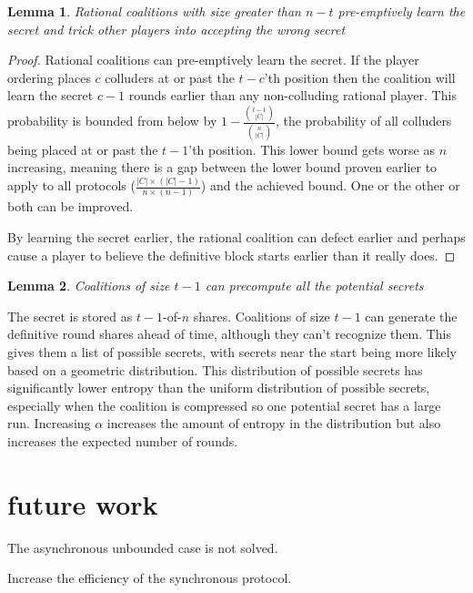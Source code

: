 \documentclass{dalcsthesis}
\newtheorem{lemma}{Lemma}
\begin{document}
\begin{lemma} Rational coalitions with size greater than $n-t$ pre-emptively learn the secret and trick other players into accepting the wrong secret \end{lemma}
\begin{proof}
Rational coalitions can pre-emptively learn the secret. If the player ordering places $c$ colluders at or past the $t-c$'th position then the coalition will learn the secret $c-1$ rounds earlier than any non-colluding rational player. This probability is bounded from below by $1 - \frac{\binom{t - 1}{|C|}}{\binom{n}{|C|}}$, the probability of all colluders being placed at or past the $t-1$'th position. This lower bound gets worse as $n$ increasing, meaning there is a gap between the lower bound proven earlier to apply to all protocols ($\frac{|C| \times (|C|-1)}{n \times (n-1)}$) and the achieved bound. One or the other or both can be improved.

By learning the secret earlier, the rational coalition can defect earlier and perhaps cause a player to believe the definitive block starts earlier than it really does.
\end{proof}

\begin{lemma} Coalitions of size $t-1$ can precompute all the potential secrets \end{lemma}

The secret is stored as $t-1$-of-$n$ shares. Coalitions of size $t-1$ can generate the definitive round shares ahead of time, although they can't recognize them. This gives them a list of possible secrets, with secrets near the start being more likely based on a geometric distribution. This distribution of possible secrets has significantly lower entropy than the uniform distribution of possible secrets, especially when the coalition is compressed so one potential secret has a large run. Increasing $\alpha$ increases the amount of entropy in the distribution but also increases the expected number of rounds.





\chapter{future work}

The asynchronous unbounded case is not solved.

Increase the efficiency of the synchronous protocol.
\end{document}
